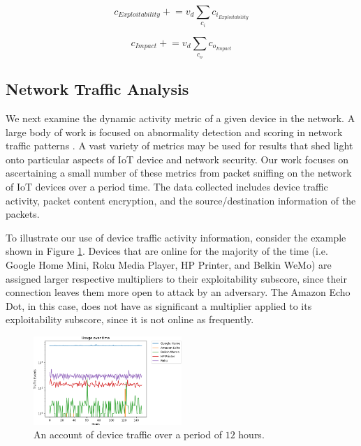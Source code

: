 \begin{equation}
c_{Exploitability} \mathrel{+}= v_d\sum_{c_i}c_{i_{Exploitability}}
\label{eq:exploitability_score}
\end{equation}

\begin{equation}
c_{Impact} \mathrel{+}= v_d\sum_{c_o}c_{o_{Impact}}
\label{eq:impact_score}
\end{equation}

\subsection{Network Traffic Analysis}

We next examine the dynamic activity metric of a given device in the network. A large body of work is focused on abnormality detection and scoring in network traffic patterns \cite{acar2018peek,apthorpe2017spying,apthorpe2017smart}. A vast variety of metrics may be used for results that shed light onto particular aspects of IoT device and network security. Our work focuses on ascertaining a small number of these metrics from packet sniffing on the network of IoT devices over a period time. The data collected includes device traffic activity, packet content encryption, and the source/destination information of the packets.

To illustrate our use of device traffic activity information, consider the example shown in Figure \ref{fig:usage_over_time}. Devices that are online for the majority of the time (i.e. Google Home Mini, Roku Media Player, HP Printer, and Belkin WeMo) are assigned larger respective multipliers to their exploitability subscore, since their connection leaves them more open to attack by an adversary. The Amazon Echo Dot, in this case, does not have as significant a multiplier applied to its exploitability subscore, since it is not online as frequently.

\begin{figure}[t]
    \centering
    \includegraphics[width=0.5\textwidth]{usageJan14.png}
    \caption{An account of device traffic over a period of $12$ hours.}
    \label{fig:usage_over_time}
\end{figure}

